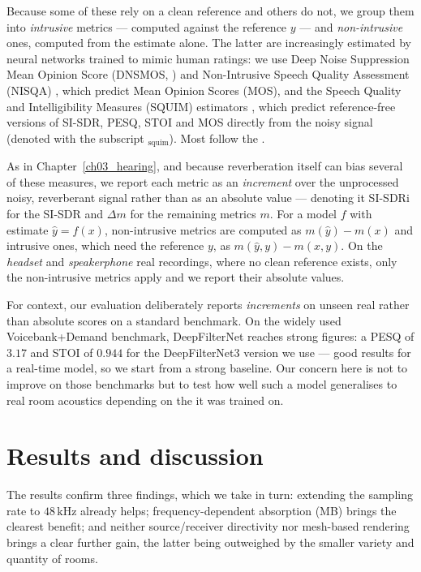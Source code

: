 Because some of these rely on a clean reference and others do not, we group them
into \emph{intrusive} metrics --- computed against the reference $y$ --- and
\emph{non-intrusive} ones, computed from the estimate alone. The latter are
increasingly estimated by neural networks trained to mimic human ratings: we
use Deep Noise Suppression Mean Opinion Score (DNSMOS, \citealp{reddy2021dnsmos}) and Non-Intrusive Speech Quality Assessment (NISQA)
\citep{mittag2021nisqa}, which predict Mean Opinion Scores (MOS), and the
Speech Quality and Intelligibility Measures (SQUIM) estimators \citep{kumar2023torchaudio}, which predict
reference-free versions of \acrshort{SI-SDR}, \acrshort{PESQ}, \acrshort{STOI}
and MOS directly from the noisy signal (denoted with the subscript
$_{\text{squim}}$). Most follow the \citet{zhang2024urgent}.

As in Chapter~\ref{ch03_hearing}, and because reverberation itself can bias
several of these measures, we report each metric as an \emph{increment} over the
unprocessed noisy, reverberant signal rather than as an absolute value ---
denoting it \acrshort{SI-SDR}i for the \acrshort{SI-SDR} and $\Delta m$ for the
remaining metrics $m$. For a model $f$ with estimate $\hat{y} = f(x)$,
non-intrusive metrics are computed as $m(\hat{y}) - m(x)$ and intrusive ones,
which need the reference $y$, as $m(\hat{y}, y) - m(x, y)$. On the
\emph{headset} and \emph{speakerphone} real recordings, where no clean reference
exists, only the non-intrusive metrics apply and we report their absolute
values.

For context, our evaluation deliberately reports \emph{increments} on unseen
real  rather than absolute scores on a standard benchmark. On
the widely used Voicebank+Demand benchmark, DeepFilterNet reaches strong
figures: a \acrshort{PESQ} of $3.17$ and
\acrshort{STOI} of $0.944$ for the DeepFilterNet3 version we use \citep[Table~1]{schroter2023deepfilternet3}--- good results for a real-time
model, so we start from a strong baseline. Our concern here is not to improve
on those benchmarks but to test how well such a model generalises to real
room acoustics depending on the  it was trained on.

\section{Results and discussion}
\label{sec:mbrirs_results}

The results confirm three findings, which we take in turn: extending the
sampling rate to $48\,\text{kHz}$ already helps; frequency-dependent absorption
(MB) brings the clearest benefit; and neither source/receiver directivity nor
mesh-based rendering brings a clear further gain, the latter being outweighed by
the smaller variety and quantity of rooms.

